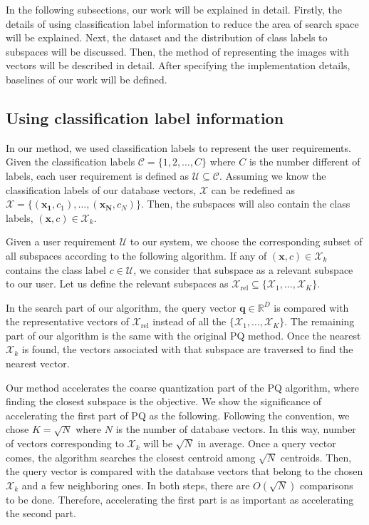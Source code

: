 In the following subsections, our work will be explained in detail. 
Firstly, the details of using classification label information to reduce the area of search space will be explained. 
Next, the dataset and the distribution of class labels to subspaces will be discussed.
Then, the method of representing the images with vectors will be described in detail. 
After specifying the implementation details, baselines of our work will be defined.

\subsection{Using classification label information}

In our method, we used classification labels to represent the user requirements. 
Given the classification labels $\mathcal{C} = \{1,2,\dots,C\}$ where $C$ is the number different of labels, each user requirement is defined as $\mathcal{U} \subseteq \mathcal{C}$. 
Assuming we know the classification labels of our database vectors, $\mathcal{X}$ can be redefined as $\mathcal{X} = \{(\bm{x_1}, c_1), \dots, (\bm{x_N}, c_N)\}$.
Then, the subspaces will also contain the class labels, $(\bm{x}, c) \in \mathcal{X}_k$.

Given a user requirement $\mathcal{U}$ to our system, we choose the corresponding subset of all subspaces according to the following algorithm.
If any of $(\bm{x}, c) \in \mathcal{X}_k$ contains the class label $c \in \mathcal{U}$, we consider that subspace as a relevant subspace to our user.
Let us define the relevant subspaces as $\mathcal{X}_\mathrm{rel} \subseteq \{\mathcal{X}_1,\dots,\mathcal{X}_K\}$.

In the search part of our algorithm, the query vector $\bm{q} \in \mathbb{R}^D$ is compared with the representative vectors of $\mathcal{X}_\mathrm{rel}$ instead of all the $\{\mathcal{X}_1,\dots,\mathcal{X}_K\}$. 
The remaining part of our algorithm is the same with the original PQ method.
Once the nearest $\mathcal{X}_k$ is found, the vectors associated with that subspace are traversed to find the nearest vector.

Our method accelerates the coarse quantization part of the PQ algorithm, where finding the closest subspace is the objective. 
We show the significance of accelerating the first part of PQ as the following.
Following the convention, we chose $K=\sqrt{N}$ where $N$ is the number of database vectors. 
In this way, number of vectors corresponding to $\mathcal{X}_k$ will be $\sqrt{N}$ in average. 
Once a query vector comes, the algorithm searches the closest centroid among $\sqrt{N}$ centroids. 
Then, the query vector is compared with the database vectors that belong to the chosen $\mathcal{X}_k$ and a few neighboring ones. 
In both steps, there are $O(\sqrt{N})$ comparisons to be done. 
Therefore, accelerating the first part is as important as accelerating the second part.

